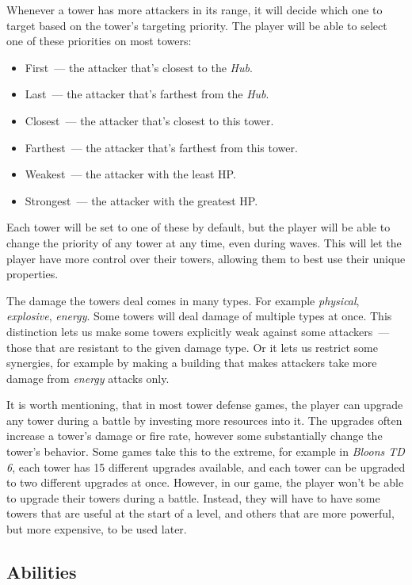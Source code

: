 Whenever a tower has more attackers in its range, it will decide which one to target based on the tower's targeting priority.
The player will be able to select one of these priorities on most towers:
\begin{itemize}
    \item First~--- the attacker that's closest to the \emph{Hub}.
    \item Last~--- the attacker that's farthest from the \emph{Hub}.
    \item Closest~--- the attacker that's closest to this tower.
    \item Farthest~--- the attacker that's farthest from this tower.
    \item Weakest~--- the attacker with the least HP.
    \item Strongest~--- the attacker with the greatest HP.
\end{itemize}
Each tower will be set to one of these by default, but the player will be able to change the priority of any tower at any time, even during waves.
This will let the player have more control over their towers, allowing them to best use their unique properties.

The damage the towers deal comes in many types.
For example \emph{physical}, \emph{explosive}, \emph{energy}.
Some towers will deal damage of multiple types at once.
This distinction lets us make some towers explicitly weak against some attackers~--- those that are resistant to the given damage type.
Or it lets us restrict some synergies, for example by making a building that makes attackers take more damage from \emph{energy} attacks only.

It is worth mentioning, that in most tower defense games, the player can upgrade any tower during a battle by investing more resources into it.
The upgrades often increase a tower's damage or fire rate, however some substantially change the tower's behavior.
Some games take this to the extreme, for example in \emph{Bloons TD 6}, each tower has 15 different upgrades available, and each tower can be upgraded to two different upgrades at once.
However, in our game, the player won't be able to upgrade their towers during a battle.
Instead, they will have to have some towers that are useful at the start of a level, and others that are more powerful, but more expensive, to be used later.

\subsection{Abilities}\label{sec:design-abilities}

